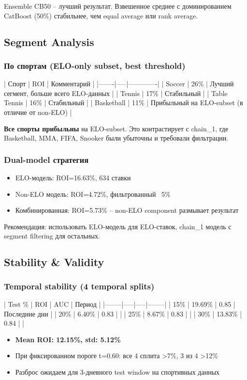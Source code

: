 \documentclass[12pt,a4paper]{article}
\begin{document}
Ensemble CB50 -- лучший результат. Взвешенное среднее с доминированием CatBoost (50\%) стабильнее, чем equal average или rank average.

\subsection{Segment Analysis}

\subsubsection{По спортам (ELO-only subset, best threshold)}
| Спорт | ROI | Комментарий |
|-------|-----|-------------|
| Soccer | 26\% | Лучший сегмент, больше всего ELO-данных |
| Tennis | 17\% | Стабильный |
| Table Tennis | 16\% | Стабильный |
| Basketball | 11\% | Прибыльный на ELO-subset (в отличие от non-ELO) |

\textbf{Все спорты прибыльны} на ELO-subset. Это контрастирует с chain\_1, где Basketball, MMA, FIFA, Snooker были убыточны и требовали фильтрации.

\subsubsection{Dual-model стратегия}
\begin{itemize}
  \item ELO-модель: ROI=16.63\%, 634 ставки
  \item Non-ELO модель: ROI=4.72\%, фильтрованный ~5\%
  \item Комбинированная: ROI=5.73\% -- non-ELO component размывает результат
\end{itemize}

Рекомендация: использовать ELO-модель для ELO-ставок, chain\_1 модель с segment filtering для остальных.

\subsection{Stability \& Validity}

\subsubsection{Temporal stability (4 temporal splits)}
| Test \% | ROI | AUC | Период |
|--------|-----|-----|--------|
| 15\% | 19.69\% | 0.85 | Последние дни |
| 20\% | 6.40\% | 0.83 | |
| 25\% | 8.67\% | 0.83 | |
| 30\% | 13.83\% | 0.84 | |

\begin{itemize}
  \item \textbf{Mean ROI: 12.15\%, std: 5.12\%}
  \item При фиксированном пороге t=0.60: все 4 сплита >7\%, 3 из 4 >12\%
  \item Разброс ожидаем для 3-дневного test window на спортивных данных
\end{itemize}
\end{document}
